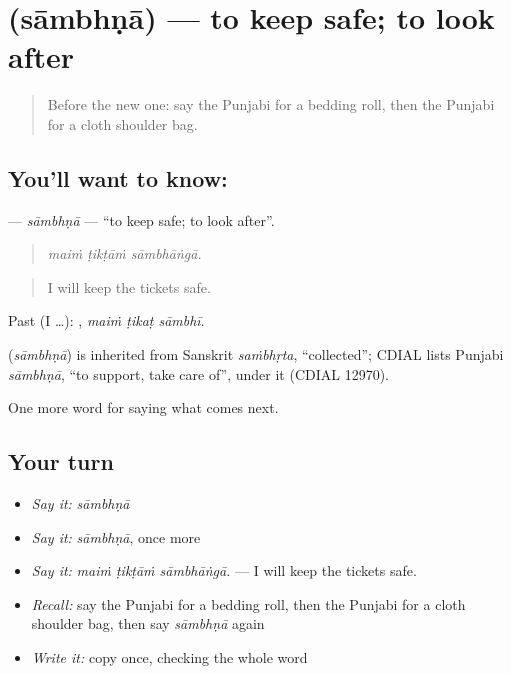 \section[\texorpdfstring{\pa{ਸਾਂਭਣਾ} (sāmbhṇā)}{ਸਾਂਭਣਾ (sāmbhṇā)}]{ (sāmbhṇā) — to keep safe; to look after}

\label{lesson:PA-C282-sambhna}



\begin{quote}
Before the new one: say the Punjabi for a bedding roll, then the Punjabi for a cloth shoulder bag.
\end{quote}

\subsection*{You'll want to know: }
\textbf{} — \emph{sāmbhṇā} — \textquotedblleft{}to keep safe; to look after\textquotedblright{}.

\begin{quote}
  
\end{quote}

\begin{quote}
\emph{maiṁ ṭikṭāṁ sāmbhāṅgā.}
\end{quote}

\begin{quote}
I will keep the tickets safe.
\end{quote}

Past (I …):   , \emph{maiṁ ṭikaṭ sāmbhī}.

\begin{cousinweb}
\textbf{} (\emph{sāmbhṇā}) is inherited from Sanskrit \emph{saṁbhṛta}, \textquotedblleft{}collected\textquotedblright{}; CDIAL lists Punjabi \emph{sāmbhṇā}, \textquotedblleft{}to support, take care of\textquotedblright{}, under it (CDIAL 12970).
\end{cousinweb}

\begin{grammarlens}[title={What you've built}]
One more word for saying what comes next.
\end{grammarlens}

\subsection*{Your turn}
\begin{itemize}
\raggedright
  \item \emph{Say it:} \emph{sāmbhṇā}
  \item \emph{Say it:} \emph{sāmbhṇā}, once more
  \item \emph{Say it:} \emph{maiṁ ṭikṭāṁ sāmbhāṅgā.} — I will keep the tickets safe.
  \item \emph{Recall:} say the Punjabi for a bedding roll, then the Punjabi for a cloth shoulder bag, then say \emph{sāmbhṇā} again
  \item \emph{Write it:} copy \textbf{} once, checking the whole word
\end{itemize}

